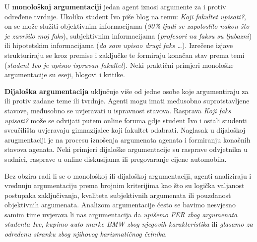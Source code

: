 U \textbf{monološkoj argumentaciji} jedan agent iznosi argumente za i protiv određene tvrdnje. 
Ukoliko student Ivo piše blog na temu: 
\emph{Koji fakultet upisati?}, on 
se može služiti objektivnim informacijama (\emph{90\% ljudi se zapoloslilo nakon što je
završilo moj faks}), subjektivnim informacijama (\emph{profesori na faksu su
ljubazni}) ili hipotetskim informacijama (\emph{da sam upisao drugi faks \dots}).
Izrečene izjave strukturiraju se kroz premise i zaključke te formiraju konačan stav 
prema temi (\emph{student Ivo je upisao ispravan fakultet}).
Neki praktični primjeri monološke argumentacije su eseji, blogovi i kritike. 

\textbf{Dijaloška argumentacija} uključuje više od jedne osobe koje 
argumentiraju za ili protiv zadane teme ili tvrdnje. Agenti mogu imati
međusobno suprotstavljene stavove, međusobno se uvjeravati 
u ispravnost stavova. Rasprava \emph{Koji faks upisati?} može se odvijati 
putem online foruma gdje student Ivo i ostali studenti 
sveučilišta uvjeravaju gimnazijalce koji fakultet odabrati.  
Naglasak u dijaloškoj arugmentaciji je na
procesu iznošenja argumenata agenata i formiranju konačnih 
stavova agenata. Neki primjeri dijaloške argumentacije su rasprave odvjetnika
u sudnici, rasprave u online diskusijama ili pregovaranje cijene 
automobila.

Bez obzira radi li se o monološkoj ili dijaloškoj argumentaciji, 
agenti analiziraju i vrednuju argumentaciju prema brojnim kriterijima
kao što su 
logička valjanost postupaka zaključivanja, 
kvaliteta subjektivnih argumenata ili
pouzdanost objektivnih argumenata. 
Analizom argumentacije često se bavimo nesvjesno
samim time uvjerava li nas argumentacija da
\emph{upišemo FER zbog argumenata studenta Ive},
\emph{kupimo auto marke BMW zbog njegovih karakteristika}
ili \emph{glasamo za određenu stranku zbog njihovog
karizmatičnog čelnika}. 


